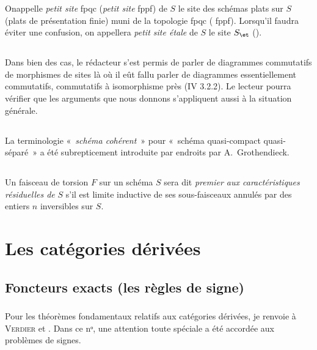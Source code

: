 \documentclass[10pt]{../fichiers-configuration-latex/smfart}
\begin{document}
On\pageoriginale appelle \emph{petit site} fpqc (\resp \emph{petit
  site} fppf) de $S$ le site des schémas plats sur $S$ (\resp plats de
  présentation finie) muni de la topologie fpqc (\resp
  fppf). Lorsqu'il faudra éviter une confusion, on appellera
  \emph{petit site étale} de $S$ le site $S_{\et}$ ().

\subsection{}
Dans bien des cas, le rédacteur s'est permis de parler de diagrammes
commutatifs de morphismes de sites là où il eût fallu parler de
diagrammes essentiellement commutatifs, \ie commutatifs à isomorphisme
près (\cf IV 3.2.2). Le lecteur pourra vérifier que les arguments que
nous donnons s'appliquent aussi à la situation générale.

\subsection{}
La terminologie « \emph{schéma cohérent} »  pour « schéma
quasi-compact quasi-séparé »  a été subrepticement introduite par
endroits par A.~Grothendieck.

\subsection{}
Un faisceau de torsion $F$ sur un schéma $S$ sera dit \emph{premier
  aux caractéristiques résiduelles de} $S$ s'il est limite inductive
  de ses sous-faisceaux annulés par des entiers $n$ inversibles sur
  $S$.

\section{Les catégories dérivées}

\subsection{Foncteurs exacts (les règles de signe)}

\subsubsection{}
Pour les théorèmes fondamentaux relatifs aux catégories dérivées, je
renvoie à \textsc{Verdier} \cite{SGA4-17:CD} et \cite{SGA4-17:V2}. Dans ce nᵒ, une
attention toute spéciale a été accordée aux problèmes de signes.
\end{document}
